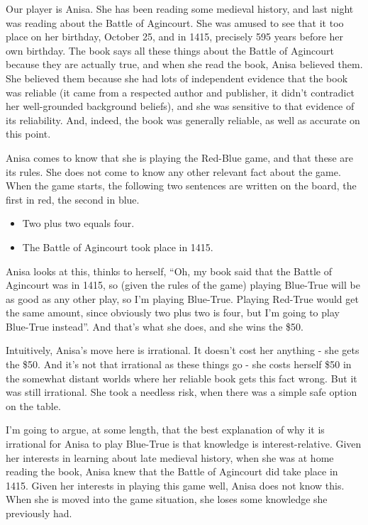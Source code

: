 \documentclass[11pt,]{book}
\providecommand{\tightlist}{%
  \setlength{\itemsep}{0pt}\setlength{\parskip}{0pt}}
\begin{document}
Our player is Anisa. She has been reading some medieval history, and last night was reading about the Battle of Agincourt. She was amused to see that it too place on her birthday, October 25, and in 1415, precisely 595 years before her own birthday. The book says all these things about the Battle of Agincourt because they are actually true, and when she read the book, Anisa believed them. She believed them because she had lots of independent evidence that the book was reliable (it came from a respected author and publisher, it didn't contradict her well-grounded background beliefs), and she was sensitive to that evidence of its reliability. And, indeed, the book was generally reliable, as well as accurate on this point.

Anisa comes to know that she is playing the Red-Blue game, and that these are its rules. She does not come to know any other relevant fact about the game. When the game starts, the following two sentences are written on the board, the first in red, the second in blue.

\begin{itemize}
\tightlist
\item
  Two plus two equals four.
\item
  The Battle of Agincourt took place in 1415.
\end{itemize}

Anisa looks at this, thinks to herself, ``Oh, my book said that the Battle of Agincourt was in 1415, so (given the rules of the game) playing Blue-True will be as good as any other play, so I'm playing Blue-True. Playing Red-True would get the same amount, since obviously two plus two is four, but I'm going to play Blue-True instead''. And that's what she does, and she wins the \$50.

Intuitively, Anisa's move here is irrational. It doesn't cost her anything - she gets the \$50. And it's not that irrational as these things go - she costs herself \$50 in the somewhat distant worlds where her reliable book gets this fact wrong. But it was still irrational. She took a needless risk, when there was a simple safe option on the table.

I'm going to argue, at some length, that the best explanation of why it is irrational for Anisa to play Blue-True is that knowledge is interest-relative. Given her interests in learning about late medieval history, when she was at home reading the book, Anisa knew that the Battle of Agincourt did take place in 1415. Given her interests in playing this game well, Anisa does not know this. When she is moved into the game situation, she loses some knowledge she previously had.
\end{document}
